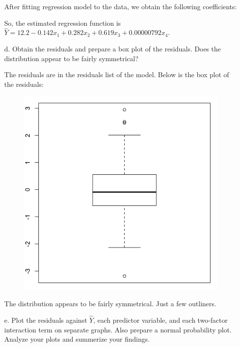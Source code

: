 \documentclass[10pt]{report}
\begin{document}
\begin{enumerate}
	After fitting regression model to the data, we obtain the following coefficients:
	
	So, the estimated regression function is $\hat{Y} = 12.2 - 0.142 x_1 + 0.282 x_2 + 0.619 x_3 + 0.00000792 x_4$.
	
	\item [d.]
	Obtain the residuals and prepare a box plot of the residuals. Does the distribution appear to be fairly symmetrical?
	
	The residuals are in the residuals list of the model. Below is the box plot of the residuals:
	\begin{figure}[H]
		\centering
		\includegraphics[width=.4\linewidth]{p2/18d.png}
	\end{figure}
	The distribution appears to be fairly symmetrical. Just a few outliners.
	
	\item [e.]
	Plot the residuals against $\hat{Y}$, each predictor variable, and each two-factor interaction term on separate graphs. Also prepare a normal probability plot. Analyze your plots and summerize your findings.
	

\end{enumerate}
\end{document}
